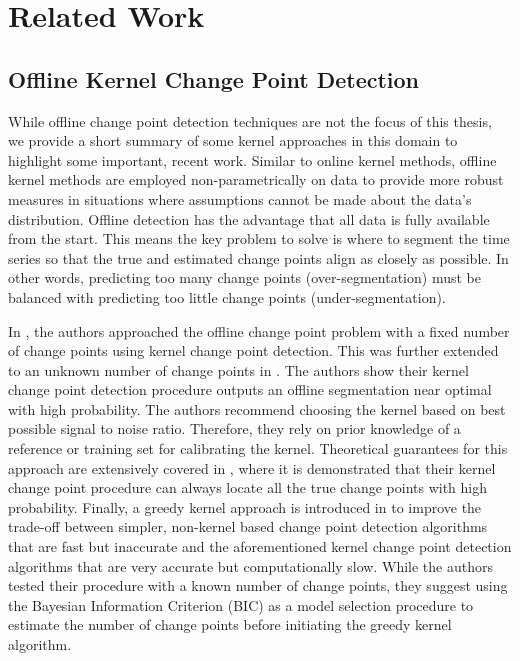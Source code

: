 \section{Related Work}
\label{related_works}

\subsection{Offline Kernel Change Point Detection}
While offline change point detection techniques are not the focus of this thesis, we provide a short summary of some kernel approaches in this domain to highlight some important, recent work.  Similar to online kernel methods, offline kernel methods are employed non-parametrically on data to provide more robust measures in situations where assumptions cannot be made about the data's distribution. Offline detection has the advantage that all data is fully available from the start. This means the key problem to solve is where to segment the time series so that the true and estimated change points align as closely as possible.  In other words, predicting too many change points (over-segmentation) must be balanced with predicting too little change points (under-segmentation). 

In \cite{harchaoui2007retrospective}, the authors approached the offline change point problem with a fixed number of change points using kernel change point detection. This was further extended to an unknown number of change points in \cite{arlot2019kernel}. The authors show their kernel change point detection procedure outputs an offline segmentation near optimal with high probability. The authors recommend choosing the kernel based on best possible signal to noise ratio. Therefore, they rely on prior knowledge of a reference or training set for calibrating the kernel. Theoretical guarantees for this approach are extensively covered in \cite{garreau2018}, where it is demonstrated that their kernel change point procedure can always locate all the true change points with high probability. Finally, a greedy kernel approach is introduced in \cite{truong2019greedy} to improve the trade-off between simpler, non-kernel based change point detection algorithms that are fast but inaccurate and the aforementioned kernel change point detection algorithms that are very accurate but computationally slow. While the authors tested their procedure with a known number of change points, they suggest using the Bayesian Information Criterion (BIC) as a model selection procedure to estimate the number of change points before initiating the greedy kernel algorithm.

